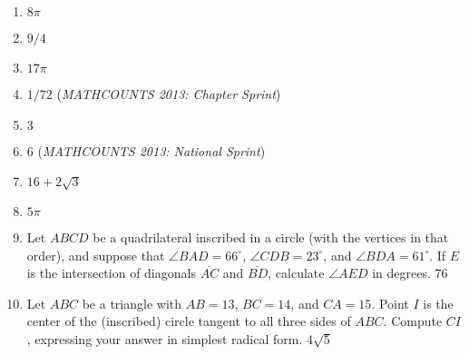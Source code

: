\documentclass{article}
\begin{document}
\begin{enumerate}
\item $8\pi$\vspace{1cm}
\item $9/4$\vspace{1cm}
\item $17\pi$\vspace{1cm}
\item $1/72$ (\emph{MATHCOUNTS 2013: Chapter Sprint})\vspace{1cm}
\item $3$\vspace{1cm}
\item $6$ (\emph{MATHCOUNTS 2013: National Sprint})\vspace{1cm}
\item $16 + 2\sqrt{3}$\vspace{1cm}
\item $5\pi$\vspace{1cm}
\item Let $ABCD$ be a quadrilateral inscribed in a circle (with the vertices in that order), and suppose that $\angle BAD = 66^{\circ}$, $\angle CDB = 23^{\circ}$, and $\angle BDA = 61^{\circ}$. If $E$ is the intersection of diagonals $\overline{AC}$ and $\overline{BD}$, calculate $\angle AED$ in degrees. $\boxed{76}$
\vspace{1cm}
\item Let $ABC$ be a triangle with $AB = 13$, $BC = 14$, and $CA = 15$. Point $I$ is the center of the (inscribed) circle tangent to all three sides of $ABC$. Compute $CI$, expressing your answer in simplest radical form. $\boxed{4\sqrt{5}}$
\end{enumerate}
\end{document}
